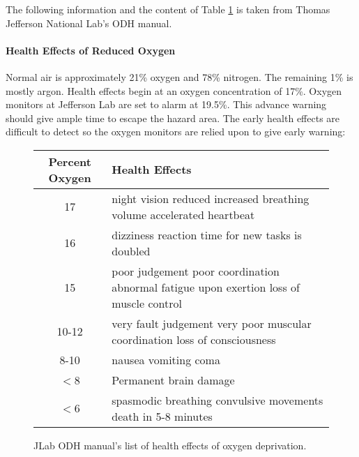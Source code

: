 The following information and the content of Table \ref{fig:jlabodh} is taken from Thomas Jefferson National Lab's ODH manual. \cite{jlabodh}

\paragraph{Health Effects of Reduced Oxygen}

Normal air is approximately 21\% oxygen and 78\% nitrogen. The remaining 1\% is mostly argon. Health effects begin at an oxygen concentration of 17\%. Oxygen monitors at Jefferson Lab are set to alarm at 19.5\%. This advance warning should give ample time to escape the hazard area.  The early health effects are difficult to detect so the oxygen monitors are relied upon to give early warning:

\begin{figure}
\centering
\begin{tabular}{|c|p{6cm}|}
 \hline
Percent Oxygen & Health Effects \\
\hline
17 & night vision reduced \newline increased breathing volume \newline accelerated heartbeat \\
\hline
16 & dizziness \newline reaction time for new tasks is doubled\\
\hline
15 & poor judgement \newline poor coordination \newline abnormal fatigue upon exertion \newline loss of muscle control\\
\hline
10-12 & very fault judgement \newline very poor muscular coordination \newline loss of consciousness\\
\hline
8-10& nausea \newline vomiting \newline coma\\
\hline
$<$8 & Permanent brain damage \\
\hline
$<$6 & spasmodic breathing \newline convulsive movements \newline death in 5-8 minutes \\
\hline
\end{tabular} 
\caption{JLab ODH manual's list of health effects of oxygen deprivation.}
\label{fig:jlabodh}
\end{figure}

